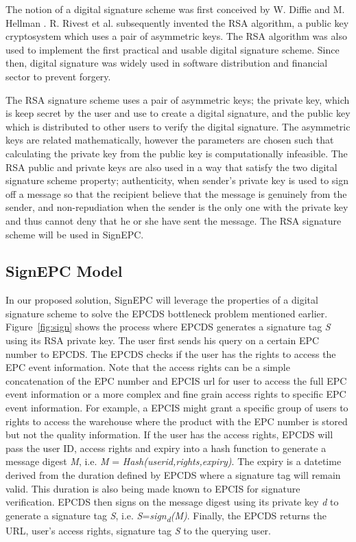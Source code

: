 \documentclass[conference]{IEEEtran}
\begin{document}
The notion of a digital signature scheme was first conceived by W. Diffie and M. Hellman \cite{dh:cry}. R. Rivest et al. \cite{rsa:sign} subsequently invented the RSA algorithm, a public key cryptosystem which uses a pair of asymmetric keys. The RSA algorithm was also used to implement the first practical and usable digital signature scheme. Since then, digital signature was widely used in software distribution and financial sector to prevent forgery. 

The RSA signature scheme uses a pair of asymmetric keys; the private key, which is keep secret by the user and use to create a digital signature, and the public key which is distributed to other users to verify the digital signature. The asymmetric keys are related mathematically, however the parameters are chosen such that calculating the private key from the public key is computationally infeasible. The RSA public and private keys are also used in a way that satisfy the two digital signature scheme property; authenticity, when sender's private key is used to sign off a message so that the recipient believe that the message is genuinely from the sender, and non-repudiation when the sender is the only one with the private key and thus cannot deny that he or she have sent the message. The RSA signature scheme will be used in SignEPC.

\subsection {SignEPC Model}
In our proposed solution, SignEPC will leverage the properties of a digital signature scheme to solve the EPCDS bottleneck problem mentioned earlier. Figure~\ref{fig:sign} shows the process where EPCDS generates a signature tag \emph{S} using its RSA private key. The user first sends his query on a certain EPC number to EPCDS. The EPCDS checks if the user has the rights to access the EPC event information. Note that the access rights can be a simple concatenation of the EPC number and EPCIS url for user to access the full EPC event information or a more complex and fine grain access rights to specific EPC event information. For example, a EPCIS might grant a specific group of users to rights to access the warehouse where the product with the EPC number is stored but not the quality information. If the user has the access rights, EPCDS will pass the user ID, access rights and expiry into a hash function to generate a message digest \emph{M}, i.e. \emph{M} = \emph{Hash(userid,rights,expiry)}. The expiry is a datetime derived from the duration defined by EPCDS where a signature tag will remain valid. This duration is also being made known to EPCIS for signature verification. EPCDS then signs on the message digest using its private key \emph{d} to generate a signature tag \emph{S}, i.e. \emph{S}=\emph{sign\textsubscript{d}(M)}. Finally, the EPCDS returns the URL, user's access rights, signature tag \emph{S} to the querying user.
\end{document}
